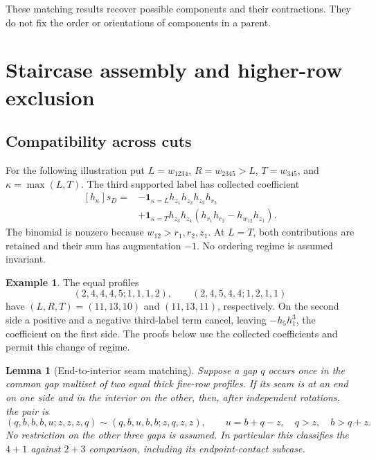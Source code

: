 \documentclass[11pt,a4paper]{amsart}
\numberwithin{equation}{section}
\theoremstyle{plain}
\newtheorem{lemma}[theorem]{Lemma}
\theoremstyle{definition}
\newtheorem{example}[theorem]{Example}
\begin{document}
These matching results recover possible components and their contractions.
They do not fix the order or orientations of components in a parent.

\section{Staircase assembly and higher-row exclusion}\label{sec:staircase-assembly}

\subsection{Compatibility across cuts}

For the following illustration put \(L=w_{1234}\),
\(R=w_{2345}>L\), \(T=w_{345}\), and \(\kappa=\max(L,T)\).
The third supported label has collected coefficient
\begin{equation}\label{eq:third-marker}
\begin{aligned}
 [h_\kappa]s_D={}&-\mathbf1_{\kappa=L}
 h_{z_1}h_{z_2}h_{z_3}h_{r_5}\\
 &+\mathbf1_{\kappa=T}h_{z_3}h_{z_4}
 (h_{r_1}h_{r_2}-h_{w_{12}}h_{z_1}).
\end{aligned}
\end{equation}
The binomial is nonzero because \(w_{12}>r_1,r_2,z_1\).
At \(L=T\), both contributions are retained and their sum has
augmentation \(-1\).  No ordering regime is assumed invariant.

\begin{example}\label{ex:mixed-stratum}
The equal profiles
\[
 (2,4,4,4,5;1,1,1,2),\qquad(2,4,5,4,4;1,2,1,1)
\]
have \((L,R,T)=(11,13,10)\) and \((11,13,11)\), respectively.
On the second side a positive and a negative third-label term cancel,
leaving \(-h_5h_1^3\), the coefficient on the first side.
The proofs below use the collected coefficients and permit this change
of regime.
\end{example}

\begin{lemma}[End-to-interior seam matching]
\label{lem:staircase-seam-crossing}
Suppose a gap \(q\) occurs once in the common gap multiset of two equal
thick five-row profiles.  If its seam is at an end on one side and in the
interior on the other, then, after independent rotations, the pair is
\[
 (q,b,b,b,u;z,z,z,q)
 \sim(q,b,u,b,b;z,q,z,z),
 \qquad u=b+q-z,\quad q>z,\quad b>q+z.
\]
No restriction on the other three gaps is assumed.  In particular this
classifies the \(4+1\) against \(2+3\) comparison, including its
endpoint-contact subcase.
\end{lemma}
\end{document}
